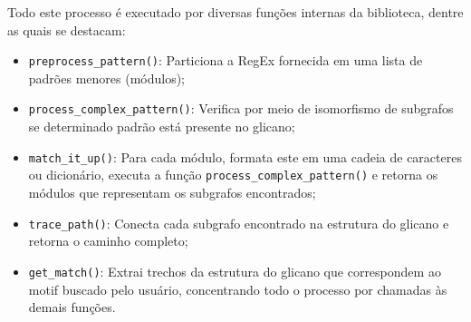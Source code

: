 Todo este processo é executado por diversas funções internas da biblioteca,
dentre as quais se destacam:
\begin{itemize}
	\item \texttt{preprocess\_pattern()}: Particiona a RegEx fornecida em uma lista de padrões menores (módulos);
	\item \texttt{process\_complex\_pattern()}: Verifica por meio de isomorfismo de subgrafos se determinado padrão está presente no glicano;
	\item \texttt{match\_it\_up()}: Para cada módulo, formata este em uma cadeia de caracteres ou dicionário, executa a função \texttt{process\_complex\_pattern()} e retorna os módulos que representam os subgrafos encontrados;
	\item \texttt{trace\_path()}: Conecta cada subgrafo encontrado na estrutura do glicano e retorna o caminho completo;
	\item \texttt{get\_match()}: Extrai trechos da estrutura do glicano que correspondem ao motif buscado pelo usuário, concentrando todo o processo por chamadas às demais funções.
\end{itemize}





